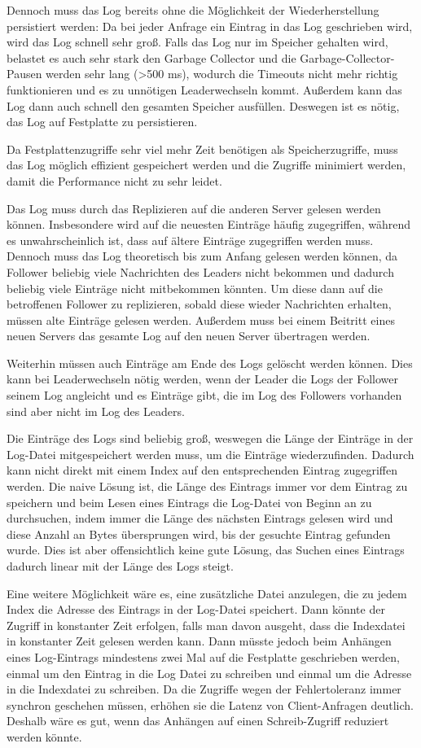 Dennoch muss das Log bereits ohne die Möglichkeit der Wiederherstellung persistiert werden: Da bei jeder Anfrage ein Eintrag in das Log geschrieben wird, wird das Log schnell sehr groß. Falls das Log nur im Speicher gehalten wird, belastet es auch sehr stark den Garbage Collector und die Garbage-Collector-Pausen werden sehr lang (\textgreater 500 ms), wodurch die Timeouts nicht mehr richtig funktionieren und es zu unnötigen Leaderwechseln kommt. Außerdem kann das Log dann auch schnell den gesamten Speicher ausfüllen. Deswegen ist es nötig, das Log auf Festplatte zu persistieren.

Da Festplattenzugriffe sehr viel mehr Zeit benötigen als Speicherzugriffe, muss das Log möglich effizient gespeichert werden und die Zugriffe minimiert werden, damit die Performance nicht zu sehr leidet.

Das Log muss durch das Replizieren auf die anderen Server gelesen werden können. Insbesondere wird auf die neuesten Einträge häufig zugegriffen, während es unwahrscheinlich ist, dass auf ältere Einträge zugegriffen werden muss. Dennoch muss das Log theoretisch bis zum Anfang gelesen werden können, da Follower beliebig viele Nachrichten des Leaders nicht bekommen und dadurch beliebig viele Einträge nicht mitbekommen könnten. Um diese dann auf die betroffenen Follower zu replizieren, sobald diese wieder Nachrichten erhalten, müssen alte Einträge gelesen werden. Außerdem muss bei einem Beitritt eines neuen Servers das gesamte Log auf den neuen Server übertragen werden.

Weiterhin müssen auch Einträge am Ende des Logs gelöscht werden können. Dies kann bei Leaderwechseln nötig werden, wenn der Leader die Logs der Follower seinem Log angleicht und es Einträge gibt, die im Log des Followers vorhanden sind aber nicht im Log des Leaders.

Die Einträge des Logs sind beliebig groß, weswegen die Länge der Einträge in der Log-Datei mitgespeichert werden muss, um die Einträge wiederzufinden. Dadurch kann nicht direkt mit einem Index auf den entsprechenden Eintrag zugegriffen werden. Die naive Lösung ist, die Länge des Eintrags immer vor dem Eintrag zu speichern und beim Lesen eines Eintrags die Log-Datei von Beginn an zu durchsuchen, indem immer die Länge des nächsten Eintrags gelesen wird und diese Anzahl an Bytes übersprungen wird, bis der gesuchte Eintrag gefunden wurde. Dies ist aber offensichtlich keine gute Lösung, das Suchen eines Eintrags dadurch linear mit der Länge des Logs steigt.

Eine weitere Möglichkeit wäre es, eine zusätzliche Datei anzulegen, die zu jedem Index die Adresse des Eintrags in der Log-Datei speichert. Dann könnte der Zugriff in konstanter Zeit erfolgen, falls man davon ausgeht, dass die Indexdatei in konstanter Zeit gelesen werden kann. Dann müsste jedoch beim Anhängen eines Log-Eintrags mindestens zwei Mal auf die Festplatte geschrieben werden, einmal um den Eintrag in die Log Datei zu schreiben und einmal um die Adresse in die Indexdatei zu schreiben. Da die Zugriffe wegen der Fehlertoleranz immer synchron geschehen müssen, erhöhen sie die Latenz von Client-Anfragen deutlich. Deshalb wäre es gut, wenn das Anhängen auf einen Schreib-Zugriff reduziert werden könnte.

